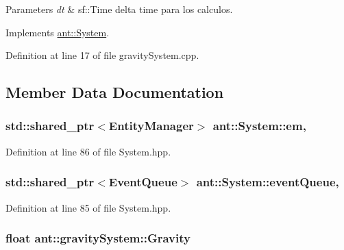 \begin{DoxyParams}{Parameters}
{\em dt} & sf\+::\+Time delta time para los calculos. \\
\hline
\end{DoxyParams}


Implements \hyperlink{classant_1_1_system_a4d97de105123df07d4d90ac2914f9e6c}{ant\+::\+System}.



Definition at line 17 of file gravity\+System.\+cpp.



\subsection{Member Data Documentation}
\hypertarget{classant_1_1_system_a5661d872ff769be150bd4e9a9552f6b9}{
\subsubsection[{em}]{\setlength{\rightskip}{0pt plus 5cm}std\+::shared\+\_\+ptr$<${\bf Entity\+Manager}$>$ ant\+::\+System\+::em\hspace{0.3cm}{\ttfamily [protected]}, {\ttfamily [inherited]}}}\label{classant_1_1_system_a5661d872ff769be150bd4e9a9552f6b9}


Definition at line 86 of file System.\+hpp.

\hypertarget{classant_1_1_system_a27e1814e13d161b5ef0e848e3da16d29}{
\subsubsection[{event\+Queue}]{\setlength{\rightskip}{0pt plus 5cm}std\+::shared\+\_\+ptr$<${\bf Event\+Queue}$>$ ant\+::\+System\+::event\+Queue\hspace{0.3cm}{\ttfamily [protected]}, {\ttfamily [inherited]}}}\label{classant_1_1_system_a27e1814e13d161b5ef0e848e3da16d29}


Definition at line 85 of file System.\+hpp.

\hypertarget{classant_1_1gravity_system_afea117eea84efab64b7014697cfa8194}{
\subsubsection[{Gravity}]{\setlength{\rightskip}{0pt plus 5cm}float ant\+::gravity\+System\+::\+Gravity\hspace{0.3cm}{\ttfamily [private]}}}\label{classant_1_1gravity_system_afea117eea84efab64b7014697cfa8194}


